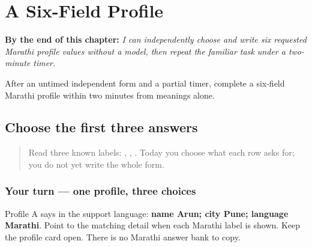 
\chapter{A Six-Field Profile}
\label{ch:mr-a1-practical-form}

\begin{chapteropening}
\textbf{By the end of this chapter:} \emph{I can independently choose and write six requested Marathi profile values without a model, then repeat the familiar task under a two-minute timer.}

After an untimed independent form and a partial timer, complete a six-field Marathi profile within two minutes from meanings alone.
\end{chapteropening}

\section[\texorpdfstring{\mr{नाव} · \mr{शहर} · \mr{भाषा} (nāv · śahar · bhāṣā)}{नाव · शहर · भाषा (nāv · śahar · bhāṣā)}]{Choose the first three answers}

\label{lesson:MR-A1F04-first-three-select}



\begin{quote}
Read three known labels: \textbf{}, \textbf{}, \textbf{}. Today you choose what each row asks for; you do not yet write the whole form.
\end{quote}

\subsection*{Your turn — one profile, three choices}
Profile A says in the support language: \textbf{name Arun; city Pune; language Marathi}. Point to the matching detail when each Marathi label is shown. Keep the profile card open. There is no Marathi answer bank to copy.


